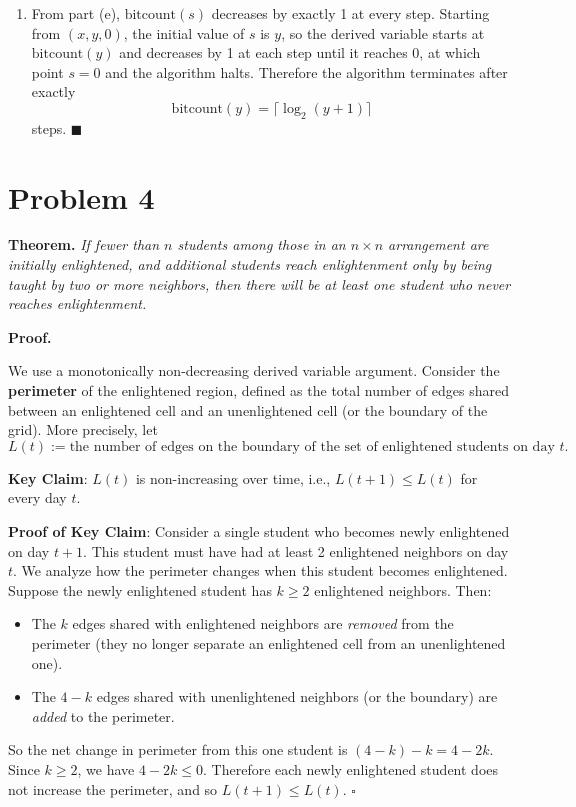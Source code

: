 \documentclass[11pt]{article}
\begin{document}
\begin{enumerate}[label=\textbf{(\alph*)}]
\item From part (e), $\text{bitcount}(s)$ decreases by exactly 1 at every step.
Starting from $(x, y, 0)$, the initial value of $s$ is $y$, so the derived variable
starts at $\text{bitcount}(y)$ and decreases by 1 at each step until it reaches $0$,
at which point $s = 0$ and the algorithm halts. Therefore the algorithm terminates
after exactly
\[
    \text{bitcount}(y) = \lceil \log_2(y+1) \rceil
\]
steps. $\blacksquare$

\end{enumerate}

\section*{Problem 4}

\textbf{Theorem.} \textit{If fewer than $n$ students among those in an $n \times n$
arrangement are initially enlightened, and additional students reach enlightenment only
by being taught by two or more neighbors, then there will be at least one student who
never reaches enlightenment.}

\textbf{Proof.}

We use a monotonically non-decreasing derived variable argument. Consider the
\textbf{perimeter} of the enlightened region, defined as the total number of edges
shared between an enlightened cell and an unenlightened cell (or the boundary of the
grid). More precisely, let
\[
    L(t) := \text{the number of edges on the boundary of the set of enlightened
    students on day } t.
\]

\textbf{Key Claim}: $L(t)$ is non-increasing over time, i.e., $L(t+1) \leq L(t)$
for every day $t$.

\textbf{Proof of Key Claim}: Consider a single student who becomes newly enlightened
on day $t+1$. This student must have had at least 2 enlightened neighbors on day $t$.
We analyze how the perimeter changes when this student becomes enlightened. Suppose
the newly enlightened student has $k \geq 2$ enlightened neighbors. Then:
\begin{itemize}
    \item The $k$ edges shared with enlightened neighbors are \textit{removed} from
    the perimeter (they no longer separate an enlightened cell from an unenlightened
    one).
    \item The $4 - k$ edges shared with unenlightened neighbors (or the boundary) are
    \textit{added} to the perimeter.
\end{itemize}
So the net change in perimeter from this one student is $(4 - k) - k = 4 - 2k$.
Since $k \geq 2$, we have $4 - 2k \leq 0$. Therefore each newly enlightened student
does not increase the perimeter, and so $L(t+1) \leq L(t)$. $\square$
\end{document}

